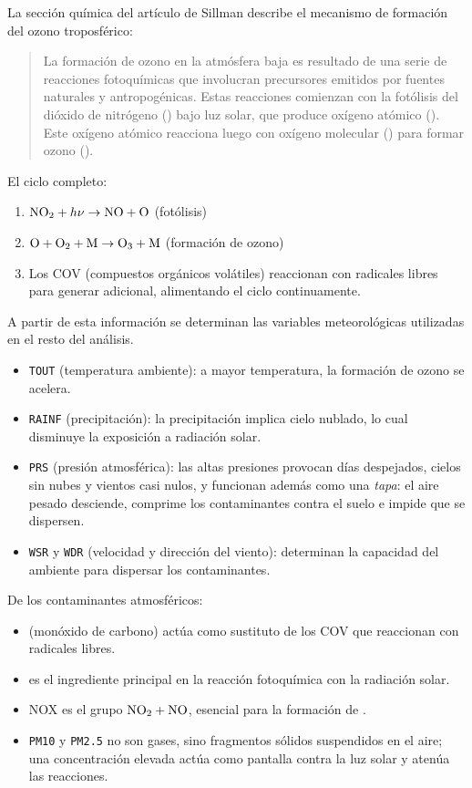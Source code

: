 La sección química del artículo de Sillman \parencite{SanfordSillman} describe el mecanismo de formación del ozono troposférico:

\begin{quote}
    La formación de ozono en la atmósfera baja es resultado de una serie de reacciones fotoquímicas que involucran precursores emitidos por fuentes naturales y antropogénicas. Estas reacciones comienzan con la fotólisis del dióxido de nitrógeno () bajo luz solar, que produce oxígeno atómico (). Este oxígeno atómico reacciona luego con oxígeno molecular () para formar ozono ().
\end{quote}

El ciclo completo:

\begin{enumerate}
    \item $\ce{NO2} + h\nu \to \ce{NO}+\ce{O}$ (fotólisis)
    \item $\ce{O} + \ce{O2} + \ce{M} \to \ce{O3} + \ce{M}$ (formación de ozono)
    \item Los COV (compuestos orgánicos volátiles) reaccionan con radicales libres para generar  adicional, alimentando el ciclo continuamente.
\end{enumerate}

A partir de esta información se determinan las variables meteorológicas utilizadas en el resto del análisis.

\begin{itemize}
    \item \texttt{TOUT} (temperatura ambiente): a mayor temperatura, la formación de ozono se acelera.
    \item \texttt{RAINF} (precipitación): la precipitación implica cielo nublado, lo cual disminuye la exposición a radiación solar.
    \item \texttt{PRS} (presión atmosférica): las altas presiones provocan días despejados, cielos sin nubes y vientos casi nulos, y funcionan además como una \textit{tapa}: el aire pesado desciende, comprime los contaminantes contra el suelo e impide que se dispersen.
    \item \texttt{WSR} y \texttt{WDR} (velocidad y dirección del viento): determinan la capacidad del ambiente para dispersar los contaminantes.
\end{itemize}

De los contaminantes atmosféricos:

\begin{itemize}
    \item {} (monóxido de carbono) actúa como sustituto de los COV que reaccionan con radicales libres.
    \item {} es el ingrediente principal en la reacción fotoquímica con la radiación solar.
    \item NOX es el grupo $\ce{NO2} + \ce{NO}$, esencial para la formación de .
    \item \texttt{PM10} y \texttt{PM2.5} no son gases, sino fragmentos sólidos suspendidos en el aire; una concentración elevada actúa como pantalla contra la luz solar y atenúa las reacciones.
\end{itemize}

